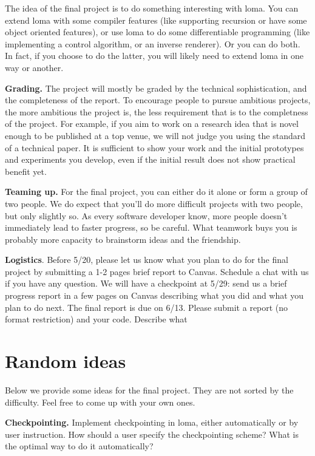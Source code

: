




The idea of the final project is to do something interesting with loma. You can extend loma with some compiler features (like supporting recursion or have some object oriented features), or use loma to do some differentiable programming (like implementing a control algorithm, or an inverse renderer). Or you can do both. In fact, if you choose to do the latter, you will likely need to extend loma in one way or another.

\textbf{Grading.} The project will mostly be graded by the technical sophistication, and the completeness of the report. To encourage people to pursue ambitious projects, the more ambitious the project is, the less requirement that
is to the completness of the project. For example, if you aim to work on a research idea that is novel enough
to be published at a top venue, we will not judge you using the standard of a technical paper. It is 
sufficient to show your work and the initial prototypes and experiments you develop, even if the initial 
result does not show practical benefit yet.

\textbf{Teaming up.} 
For the final project, you can either do it alone or form a group of two people. We do expect that you’ll do more difficult projects with two people, but only slightly so. As every software developer
know, more people doesn’t immediately lead to faster progress, so be careful. What teamwork buys you is
probably more capacity to brainstorm ideas and the friendship.

\textbf{Logistics}. Before 5/20, please let us know what you plan to do for the final project by submitting a 1-2 pages brief report to Canvas. 
Schedule a chat with us if you have any question. We will have a checkpoint at
5/29: send us a brief progress report in a few pages on Canvas describing what you did and what you plan to do next.
The final report is due on 6/13. Please submit a report (no format restriction) and your code.
Describe what


\section{Random ideas}

Below we provide some ideas for the final project. They are not sorted by the difficulty. Feel free to come up with your own ones.

\textbf{Checkpointing.} 
Implement checkpointing in loma, either automatically or by user instruction. 
How should a user specify the checkpointing scheme? What is the optimal way to do it automatically?


